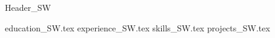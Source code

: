 {Header_SW}


\makecvheader
\vspace{10pt}

{education_SW.tex}
\vspace{4pt}
{experience_SW.tex}
\vspace{4pt}
{skills_SW.tex}
\vspace{4pt}
{projects_SW.tex}


